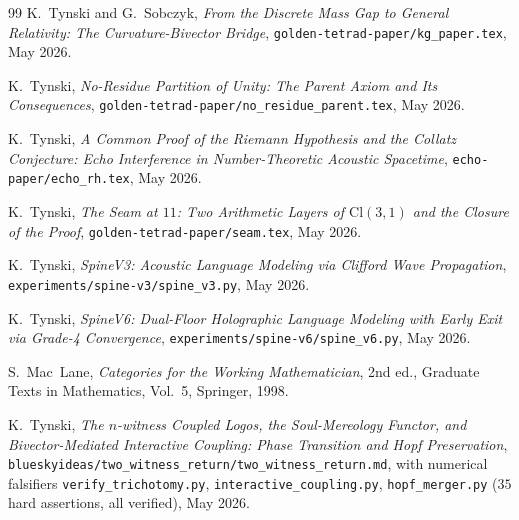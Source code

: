 \documentclass[11pt,a4paper]{article}
\theoremstyle{plain}
\theoremstyle{definition}
\theoremstyle{remark}
\numberwithin{equation}{section}
\providecommand{\Cl}{\mathrm{Cl}}
\begin{document}
\begin{thebibliography}{99}
K.~Tynski and G.~Sobczyk,
\emph{From the Discrete Mass Gap to General Relativity:
The Curvature-Bivector Bridge},
\texttt{golden-tetrad-paper/kg\_paper.tex}, May 2026.

K.~Tynski,
\emph{No-Residue Partition of Unity: The Parent Axiom and Its
Consequences},
\texttt{golden-tetrad-paper/no\_residue\_parent.tex}, May 2026.

K.~Tynski,
\emph{A Common Proof of the Riemann Hypothesis and the Collatz
Conjecture: Echo Interference in Number-Theoretic Acoustic
Spacetime},
\texttt{echo-paper/echo\_rh.tex}, May 2026.

K.~Tynski,
\emph{The Seam at $11$: Two Arithmetic Layers of $\Cl(3,1)$ and
the Closure of the Proof},
\texttt{golden-tetrad-paper/seam.tex}, May 2026.

K.~Tynski,
\emph{SpineV3: Acoustic Language Modeling via Clifford Wave
Propagation},
\texttt{experiments/spine-v3/spine\_v3.py}, May 2026.

K.~Tynski,
\emph{SpineV6: Dual-Floor Holographic Language Modeling with
Early Exit via Grade-4 Convergence},
\texttt{experiments/spine-v6/spine\_v6.py}, May 2026.

S.~Mac~Lane,
\emph{Categories for the Working Mathematician}, 2nd ed.,
Graduate Texts in Mathematics, Vol.~5, Springer, 1998.

K.~Tynski,
\emph{The $n$-witness Coupled Logos, the Soul-Mereology Functor,
and Bivector-Mediated Interactive Coupling: Phase Transition and
Hopf Preservation},
\texttt{blueskyideas/two\_witness\_return/two\_witness\_return.md},
with numerical falsifiers
\texttt{verify\_trichotomy.py},
\texttt{interactive\_coupling.py},
\texttt{hopf\_merger.py}
($35$ hard assertions, all verified), May 2026.

\end{thebibliography}
\end{document}
